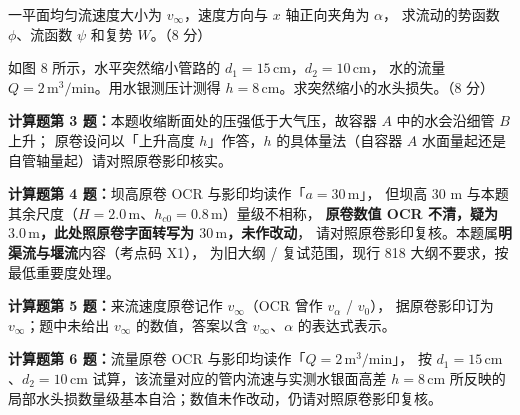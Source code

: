 \begin{ti}
  \item 一平面均匀流速度大小为 $v_\infty$，速度方向与 $x$ 轴正向夹角为 $\alpha$，
  求流动的势函数 $\phi$、流函数 $\psi$ 和复势 $W$。（8 分）\hfill{}

  \item 如图 8 所示，水平突然缩小管路的 $d_1=15\,\mathrm{cm}$，$d_2=10\,\mathrm{cm}$，
  水的流量 $Q=2\,\mathrm{m^3/min}$。用水银测压计测得 $h=8\,\mathrm{cm}$。求突然缩小的水头损失。（8 分）
  \hfill{}
\end{ti}

\begin{tishi}
\textbf{计算题第 3 题：}本题收缩断面处的压强低于大气压，故容器 $A$ 中的水会沿细管 $B$ 上升；
原卷设问以「上升高度 $h$」作答，$h$ 的具体量法（自容器 $A$ 水面量起还是自管轴量起）请对照原卷影印核实。

\textbf{计算题第 4 题：}坝高原卷 OCR 与影印均读作「$a=30\,\mathrm{m}$」，
但坝高 30 m 与本题其余尺度（$H=2.0\,\mathrm{m}$、$h_{c0}=0.8\,\mathrm{m}$）量级不相称，
\textbf{原卷数值 OCR 不清，疑为 $3.0\,\mathrm{m}$，此处照原卷字面转写为 $30\,\mathrm{m}$，未作改动}，
请对照原卷影印复核。本题属\textbf{明渠流与堰流}内容（考点码 X1），
为旧大纲 / 复试范围，现行 818 大纲不要求，按最低重要度处理。

\textbf{计算题第 5 题：}来流速度原卷记作 $v_\infty$（OCR 曾作 $v_\alpha$ / $v_0$），
据原卷影印订为 $v_\infty$；题中未给出 $v_\infty$ 的数值，答案以含 $v_\infty$、$\alpha$ 的表达式表示。

\textbf{计算题第 6 题：}流量原卷 OCR 与影印均读作「$Q=2\,\mathrm{m^3/min}$」，
按 $d_1=15\,\mathrm{cm}$、$d_2=10\,\mathrm{cm}$ 试算，该流量对应的管内流速与实测水银面高差 $h=8\,\mathrm{cm}$
所反映的局部水头损数量级基本自洽；数值未作改动，仍请对照原卷影印复核。
\end{tishi}
